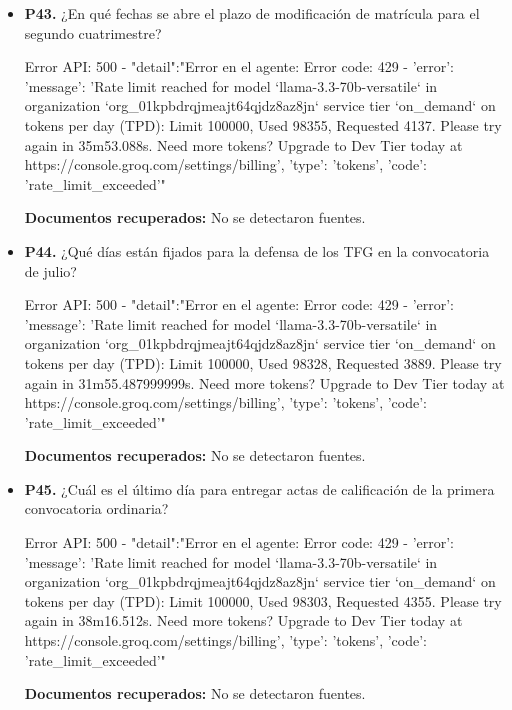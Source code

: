 \documentclass{article}
\begin{document}
\begin{itemize}
  \item \textbf{P43.} ¿En qué fechas se abre el plazo de modificación de matrícula para el segundo cuatrimestre? \\
    \begin{respuesta_agente}
      Error API: 500 - {"detail":"Error en el agente: Error code: 429 - {'error': {'message': 'Rate limit reached for model `llama-3.3-70b-versatile` in organization `org_01kpbdrqjmeajt64qjdz8az8jn` service tier `on_demand` on tokens per day (TPD): Limit 100000, Used 98355, Requested 4137. Please try again in 35m53.088s. Need more tokens? Upgrade to Dev Tier today at https://console.groq.com/settings/billing', 'type': 'tokens', 'code': 'rate_limit_exceeded'}}"}
    \end{respuesta_agente}
    \vspace{0.2cm}
    \noindent\textbf{Documentos recuperados:} No se detectaron fuentes.

  \item \textbf{P44.} ¿Qué días están fijados para la defensa de los TFG en la convocatoria de julio? \\
    \begin{respuesta_agente}
      Error API: 500 - {"detail":"Error en el agente: Error code: 429 - {'error': {'message': 'Rate limit reached for model `llama-3.3-70b-versatile` in organization `org_01kpbdrqjmeajt64qjdz8az8jn` service tier `on_demand` on tokens per day (TPD): Limit 100000, Used 98328, Requested 3889. Please try again in 31m55.487999999s. Need more tokens? Upgrade to Dev Tier today at https://console.groq.com/settings/billing', 'type': 'tokens', 'code': 'rate_limit_exceeded'}}"}
    \end{respuesta_agente}
    \vspace{0.2cm}
    \noindent\textbf{Documentos recuperados:} No se detectaron fuentes.

  \item \textbf{P45.} ¿Cuál es el último día para entregar actas de calificación de la primera convocatoria ordinaria? \\
    \begin{respuesta_agente}
      Error API: 500 - {"detail":"Error en el agente: Error code: 429 - {'error': {'message': 'Rate limit reached for model `llama-3.3-70b-versatile` in organization `org_01kpbdrqjmeajt64qjdz8az8jn` service tier `on_demand` on tokens per day (TPD): Limit 100000, Used 98303, Requested 4355. Please try again in 38m16.512s. Need more tokens? Upgrade to Dev Tier today at https://console.groq.com/settings/billing', 'type': 'tokens', 'code': 'rate_limit_exceeded'}}"}
    \end{respuesta_agente}
    \vspace{0.2cm}
    \noindent\textbf{Documentos recuperados:} No se detectaron fuentes.


\end{itemize}
\end{document}
